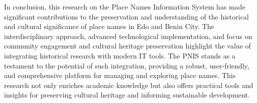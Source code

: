 In conclusion, this research on the Place Names Information System has made significant contributions to the preservation and understanding of the historical and cultural significance of place names in Edo and Benin City. The interdisciplinary approach, advanced technological implementation, and focus on community engagement and cultural heritage preservation highlight the value of integrating historical research with modern IT tools. The PNIS stands as a testament to the potential of such integration, providing a robust, user-friendly, and comprehensive platform for managing and exploring place names. This research not only enriches academic knowledge but also offers practical tools and insights for preserving cultural heritage and informing sustainable development.
